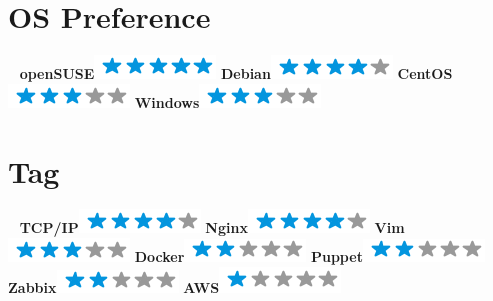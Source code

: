 \documentclass[]{friggeri-cv}
\begin{document}
\begin{aside}
  \section{OS Preference}
  ~
    \textbf{openSUSE}\includegraphics[scale=0.40]{img/5stars.png}
    \textbf{Debian}\includegraphics[scale=0.40]{img/4stars.png}
    \textbf{CentOS}\includegraphics[scale=0.40]{img/3stars.png}
    \textbf{Windows}\includegraphics[scale=0.40]{img/3stars.png}
  ~
  \section{Tag}
  ~
  \textbf{TCP/IP}\includegraphics[scale=0.40]{img/4stars.png}
  \textbf{Nginx}\includegraphics[scale=0.40]{img/4stars.png}
  \textbf{Vim}\includegraphics[scale=0.40]{img/3stars.png}
  \textbf{Docker}\includegraphics[scale=0.40]{img/2stars.png}
  \textbf{Puppet}\includegraphics[scale=0.40]{img/2stars.png}
  \textbf{Zabbix}\includegraphics[scale=0.40]{img/2stars.png}
  \textbf{AWS}\includegraphics[scale=0.40]{img/1stars.png}
  ~
\end{aside}
\end{document}
